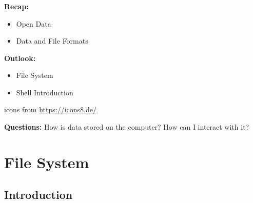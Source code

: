 \documentclass[hyperref={pdfpagelabels=false},aspectratio=169]{beamer}
\begin{document}
\begin{frame}
\frametitle{}
\begin{minipage}{0.54\textwidth}
	\textbf{Recap:}
	\begin{itemize}
		\item Open Data
		\item Data and File Formats
	\end{itemize}

\vspace{15pt}
\textbf{Outlook:}

\begin{itemize}
	\item File System
	\item Shell Introduction
\end{itemize}

\end{minipage}
\hfill
\begin{minipage}{0.45\textwidth}
\begin{center}
        	\tiny
        icons from \url{https://icons8.de/}
\end{center}
\end{minipage}

\vspace{25pt}

\textbf{Questions:}
How is data stored on the computer? How can I interact with it?
\end{frame}


\section{File System}

\begin{frame}
	\tableofcontents[currentsection]
\end{frame}


\subsection*{Introduction}
\end{document}
